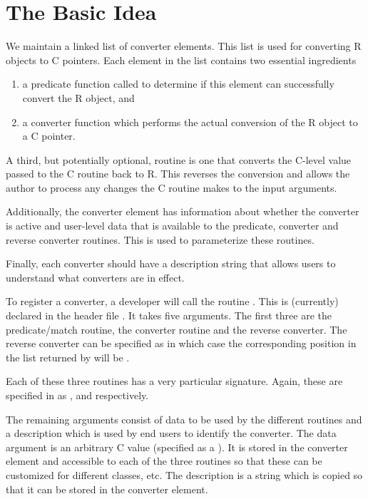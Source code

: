 \documentclass{article}
\begin{document}
\section{The Basic Idea}

We maintain a linked list of converter elements.  This list is used for
converting R objects to C pointers.
Each element in the list contains two essential ingredients
\begin{enumerate}
\item a predicate function called to determine if this
element can successfully convert the R object, and
\item a converter function which performs the actual conversion
of the R object to a C pointer.
\end{enumerate}
A third, but potentially optional, routine is one that converts the
C-level value passed to the C routine back to R.  This reverses the
conversion and allows the author to process any changes the C routine
makes to the input arguments.

Additionally, the converter element has information about whether the
converter is active and user-level data that is available to the
predicate, converter and reverse converter routines.  This is used to
parameterize these routines.

Finally, each converter should have a description string that allows
users to understand what converters are in effect.

To register a converter, a developer will call the routine
. This is (currently) declared in the
header file .  It takes five arguments.  The
first three are the predicate/match routine, the converter routine and
the reverse converter. The reverse converter can be specified as
\CNull in which case the corresponding position in the list returned
by  will be \SNull{}. 

Each of these three routines has a very particular signature.  Again,
these are specified in  as
,  and
 respectively.

The remaining arguments consist of data to be used by the different
routines and a description which is used by end users to identify the
converter.  The data argument is an arbitrary C value (specified as a
). It is stored in the converter element and accessible
to each of the three routines so that these can be customized for
different classes, etc.  The description is a string which is copied
so that it can be stored in the converter element.
\end{document}

